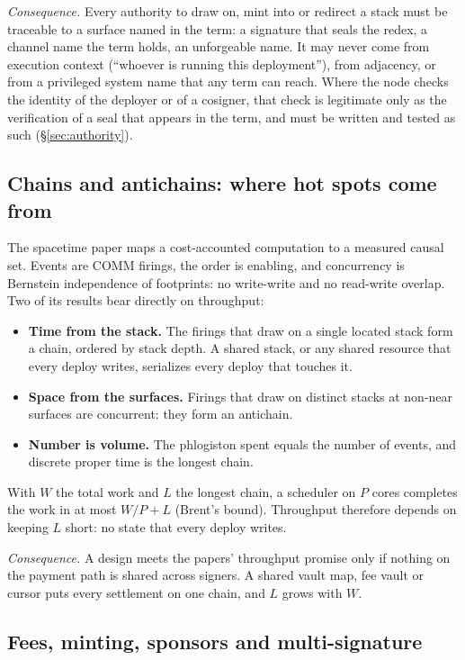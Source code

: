 \documentclass[11pt]{article}
\begin{document}
\emph{Consequence.} Every authority to draw on, mint into or redirect a stack must be traceable to a surface named in the term: a signature that seals the redex, a channel name the term holds, an unforgeable name. It may never come from execution context (``whoever is running this deployment''), from adjacency, or from a privileged system name that any term can reach. Where the node checks the identity of the deployer or of a cosigner, that check is legitimate only as the verification of a seal that appears in the term, and must be written and tested as such (\S\ref{sec:authority}).

\subsection{Chains and antichains: where hot spots come from}

The spacetime paper maps a cost-accounted computation to a measured causal set. Events are COMM firings, the order is enabling, and concurrency is Bernstein independence of footprints: no write-write and no read-write overlap. Two of its results bear directly on throughput:
\begin{itemize}
\item \textbf{Time from the stack.} The firings that draw on a single located stack form a chain, ordered by stack depth. A shared stack, or any shared resource that every deploy writes, serializes every deploy that touches it.
\item \textbf{Space from the surfaces.} Firings that draw on distinct stacks at non-near surfaces are concurrent: they form an antichain.
\item \textbf{Number is volume.} The phlogiston spent equals the number of events, and discrete proper time is the longest chain.
\end{itemize}
With $W$ the total work and $L$ the longest chain, a scheduler on $P$ cores completes the work in at most $W/P + L$ (Brent's bound). Throughput therefore depends on keeping $L$ short: no state that every deploy writes.

\emph{Consequence.} A design meets the papers' throughput promise only if nothing on the payment path is shared across signers. A shared vault map, fee vault or cursor puts every settlement on one chain, and $L$ grows with $W$.

\subsection{Fees, minting, sponsors and multi-signature}
\end{document}
